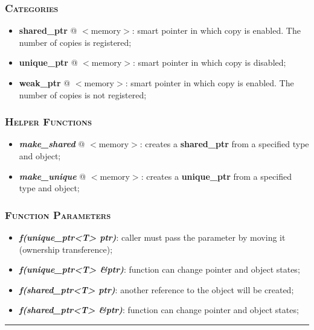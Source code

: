 \documentclass[10pt]{article}
\begin{document}
\begin{multicols*}{5}
{\subsubsection*{\textsc{Categories}} 
\begin{itemize}[leftmargin=*,topsep=0.25pt]
  \setlength\itemsep{-1.8pt}
	\item  {\textbf{shared\_ptr}} @ $<$memory$>$: smart pointer in which copy is enabled. The number of copies is registered;
	\item  {\textbf{unique\_ptr}} @ $<$memory$>$: smart pointer in which copy is disabled;
	\item  {\textbf{weak\_ptr}} @ $<$memory$>$: smart pointer in which copy is enabled. The number of copies is not registered;
\end{itemize}

\subsubsection*{\textsc{Helper Functions}} 
\begin{itemize}[leftmargin=*,topsep=0.25pt]
  \setlength\itemsep{-1.8pt}
	\item  \emph{\textbf{make\_shared}} @ $<$memory$>$: creates a \textbf{shared\_ptr} from a specified type and object;
	\item  \emph{\textbf{make\_unique}} @ $<$memory$>$: creates a \textbf{unique\_ptr} from a specified type and object;
\end{itemize}

\subsubsection*{\textsc{Function Parameters}} 
\begin{itemize}[leftmargin=*,topsep=0.25pt]
  \setlength\itemsep{-1.8pt}
	\item  \emph{\textbf{f(unique\_ptr<T> ptr)}}: caller must pass the parameter by moving it (ownership transference);
	\item  \emph{\textbf{f(unique\_ptr<T> \&ptr)}}: function can change pointer and object states;
	\item  \emph{\textbf{f(shared\_ptr<T> ptr)}}: another reference to the object will be created;
	\item  \emph{\textbf{f(shared\_ptr<T> \&ptr)}}: function can change pointer and object states;
\end{itemize}


}

\par\noindent\rule{155pt}{0.4pt}


\end{multicols*}
\end{document}
